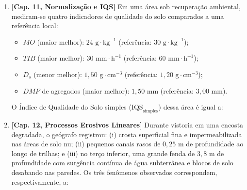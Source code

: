 \begin{enumerate}[leftmargin=1.8em, itemsep=8pt]
  \item \textbf{[Cap. 11, Normalização e IQS]} Em uma área sob recuperação ambiental, mediram-se quatro indicadores de qualidade do solo comparados a uma referência local:
  \begin{itemize}[leftmargin=1.4em, itemsep=1.5pt]
    \item $MO$ (maior melhor): $24\text{ g}\cdot\text{kg}^{-1}$ (referência: $30\text{ g}\cdot\text{kg}^{-1}$);
    \item $TIB$ (maior melhor): $30\text{ mm}\cdot\text{h}^{-1}$ (referência: $60\text{ mm}\cdot\text{h}^{-1}$);
    \item $D_s$ (menor melhor): $1{,}50\text{ g}\cdot\text{cm}^{-3}$ (referência: $1{,}20\text{ g}\cdot\text{cm}^{-3}$);
    \item $DMP$ de agregados (maior melhor): $1{,}50\text{ mm}$ (referência: $3{,}00\text{ mm}$).
  \end{itemize}
  O Índice de Qualidade do Solo simples ($\text{IQS}_{\text{simples}}$) dessa área é igual a:

  \item \textbf{[Cap. 12, Processos Erosivos Lineares]} Durante vistoria em uma encosta degradada, o geógrafo registrou: (i) crosta superficial fina e impermeabilizada nas áreas de solo nu; (ii) pequenos canais rasos de $0{,}25\text{ m}$ de profundidade ao longo de trilhas; e (iii) no terço inferior, uma grande fenda de $3{,}8\text{ m}$ de profundidade com surgência contínua de água subterrânea e blocos de solo desabando nas paredes. Os três fenômenos observados correspondem, respectivamente, a:


\end{enumerate}
